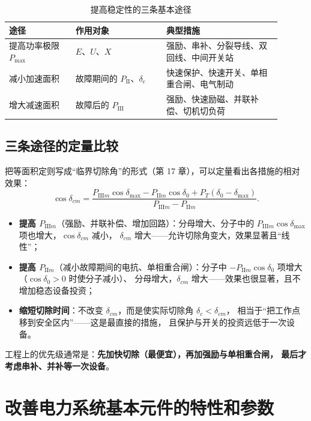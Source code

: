 \begin{table}[htbp]
  \centering
  \caption{提高稳定性的三条基本途径}
  \small
  \begin{tabular}{@{}p{0.22\linewidth}p{0.30\linewidth}p{0.38\linewidth}@{}}
    \toprule
    途径 & 作用对象 & 典型措施 \\
    \midrule
    提高功率极限 $P_{\max}$ & $E$、$U$、$X$ & 强励、串补、分裂导线、双回线、中间开关站 \\
    减小加速面积 & 故障期间的 $P_{\text{II}}$、$\delta_c$ & 快速保护、快速开关、单相重合闸、电气制动 \\
    增大减速面积 & 故障后的 $P_{\text{III}}$ & 强励、快速励磁、并联补偿、切机切负荷 \\
    \bottomrule
  \end{tabular}
\end{table}

\subsection{三条途径的定量比较}

把等面积定则写成“临界切除角”的形式（第 17 章），可以定量看出各措施的相对效果：
\begin{equation}
  \cos\delta_{cm}
  =\frac{P_{\text{III}m}\cos\delta_{\max}-P_{\text{II}m}\cos\delta_0
  +P_T\left(\delta_0-\delta_{\max}\right)}{P_{\text{III}m}-P_{\text{II}m}} .
\end{equation}
\begin{itemize}
  \item \textbf{提高 $P_{\text{III}m}$}（强励、并联补偿、增加回路）：分母增大、分子中的
        $P_{\text{III}m}\cos\delta_{\max}$ 项也增大，$\cos\delta_{cm}$ 减小，
        $\delta_{cm}$ 增大——允许切除角变大，效果显著且“线性”；
  \item \textbf{提高 $P_{\text{II}m}$}（减小故障期间的电抗、单相重合闸）：分子中
        $-P_{\text{II}m}\cos\delta_0$ 项增大（$\cos\delta_0>0$ 时使分子减小）、
        分母增大，$\delta_{cm}$ 增大——效果也很显著，且不增加稳态设备投资；
  \item \textbf{缩短切除时间}：不改变 $\delta_{cm}$，而是使实际切除角 $\delta_c<\delta_{cm}$，
        相当于“把工作点移到安全区内”——这是最直接的措施，
        且保护与开关的投资远低于一次设备。
\end{itemize}
工程上的优先级通常是：\textbf{先加快切除（最便宜），再加强励与单相重合闸，
最后才考虑串补、并补等一次设备}。

\section{改善电力系统基本元件的特性和参数}

